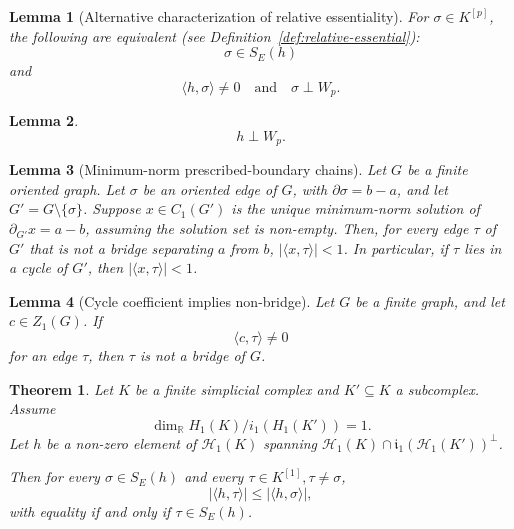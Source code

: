 \documentclass[10pt,a4paper]{amsart}
\newtheorem{lemma}{Lemma}
\newtheorem{theorem}{Theorem}
\newcommand{\hide}[1]{}
\begin{document}
\begin{lemma}[Alternative characterization of relative essentiality]
\label{lem:linear}
For \(\sigma \in K^{[p]}\), the following are equivalent (see Definition~\ref{def:relative-essential}):
\[
\sigma\in S_E(h)
\]
and
\[
\langle h,\sigma\rangle\neq 0
\quad\text{and}\quad
\sigma\perp W_p.
\]
\end{lemma}

\begin{lemma}
\label{lem:orthogonality}
\[
h\perp W_p.
\]
\end{lemma}

\begin{lemma}[Minimum-norm prescribed-boundary chains]
\label{lem:graph}
Let \(G\) be a finite oriented graph. Let \(\sigma\) be an oriented edge of
\(G\), with
$
\partial\sigma=b-a
$,
and let
$
G'=G\setminus\{\sigma\}
$.
Suppose 
\(x\in C_1(G')\) is the unique minimum-norm solution of
$
\partial_{G'} x=a-b
$,
assuming the solution set is non-empty.
Then, for every edge \(\tau\) of \(G'\) that is not a bridge separating \(a\)
from \(b\),
$
|\langle x,\tau\rangle|<1
$.
In particular, if \(\tau\) lies in a cycle of \(G'\), then
$
|\langle x,\tau\rangle|<1
$.
\end{lemma}

\begin{lemma}[Cycle coefficient implies non-bridge]
\label{lem:bridge}
Let \(G\) be a finite graph, and let \(c\in Z_1(G)\). If
\[
\langle c,\tau\rangle\neq 0
\]
for an edge \(\tau\), then \(\tau\) is not a bridge of \(G\).
\end{lemma}

\begin{theorem}
\label{thm:simplified}
Let \(K\) be a finite simplicial complex and \(K'\subseteq K\) a subcomplex.
Assume
\begin{equation}
\label{eqn:thm:simplified}
\dim_{\mathbb R} H_1(K)/i_1(H_1(K'))=1.
\end{equation}
Let $h$ be a non-zero element of \(\mathcal H_1(K)\) spanning
\(\mathcal H_1(K)\cap \mathfrak{i}_1(\mathcal H_1(K'))^\perp\).
\hide{
Then for every \(\sigma\in S_E(h)\) and every \(\tau\in S_N(h)\),
\[
|\langle h,\tau\rangle|<|\langle h,\sigma\rangle|.
\]
}
Then for every \(\sigma\in S_E(h)\) and every \(\tau\in K^{[1]}, \tau \neq \sigma\),
\[
|\langle h,\tau\rangle| \leq |\langle h,\sigma\rangle|,
\]
with equality if and only if $\tau \in S_E(h)$.
\end{theorem}
\end{document}
